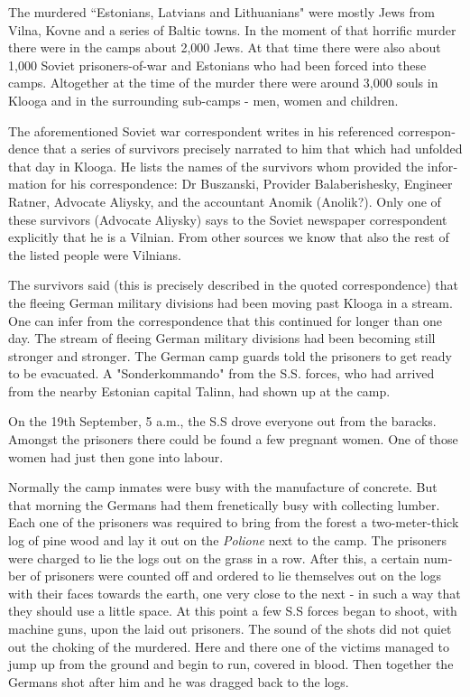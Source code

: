 \documentclass{article}
\begin{document}
\begin{pairs}
\begin{Leftside}
\begin{english}
The murdered ``Estonians, Latvians and Lithuanians" were mostly Jews from Vilna, Kovne and a series
of Baltic towns. In the moment of that horrific murder there were in the camps about 2,000 Jews.
At that time there were also about 1,000 Soviet prisoners-of-war and Estonians who had been forced
into these camps. Altogether at the time of the murder there were around 3,000 souls in Klooga and in the 
surrounding sub-camps - men, women and children.

The aforementioned Soviet war correspondent writes in his referenced correspondence that a 
series of survivors precisely narrated to him that which had unfolded that day in Klooga. He lists the names
of the survivors whom provided the information for his correspondence: Dr Buszanski, Provider Balaberishesky,
Engineer Ratner, Advocate Aliysky, and the accountant Anomik (Anolik?). Only one of these survivors (Advocate
Aliysky) says to the Soviet newspaper correspondent explicitly that he is a Vilnian. From other sources we know
that also the rest of the listed people were Vilnians.

The survivors said (this is precisely described in the quoted correspondence) that the fleeing German military
divisions had been moving past Klooga in a stream. One can infer from the correspondence that this continued 
for longer than one day. The stream of fleeing German military divisions had been becoming still stronger and
stronger. The German camp guards told the prisoners to get ready to be evacuated. A "Sonderkommando"
from the S.S. forces, who had arrived from the nearby Estonian capital Talinn, had shown up at the camp.

On the 19th September, 5 a.m., the S.S drove everyone out from the baracks. Amongst the prisoners there could be found
a few pregnant women. One of those women had just then gone into labour.

Normally the camp inmates were busy with the manufacture of concrete. But that morning the Germans had them frenetically
busy with collecting lumber. Each one of the prisoners was required to bring from the forest a two-meter-thick log of pine wood and
lay it out on the \emph{Polione} next to the camp. The prisoners were charged to lie the logs out on the grass in a row. After this,
a certain number of prisoners were counted off and ordered to lie themselves out on the logs with their faces towards the earth,
one very close to the next - in such a way that they should use a little space. At this point a few S.S forces began to shoot, with
machine guns, upon the laid out prisoners. The sound of the shots did not quiet out the choking of the murdered. Here and there
one of the victims managed to jump up from the ground and begin to run, covered in blood. Then together the Germans shot after him 
and he was dragged back to the logs. 

\endnumbering
\end{english}
\end{Leftside}

\end{pairs}
\Columns
\end{document}

